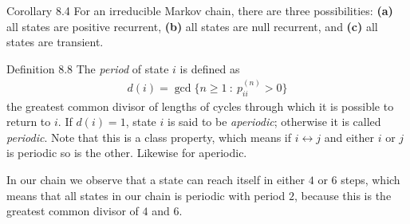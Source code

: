 \begin{boks}{Corollary 8.4}
  For an irreducible Markov chain, there are three possibilities: \textbf{(a)} all states are positive recurrent, \textbf{(b)} all states are null recurrent, and \textbf{(c)} all states are transient.
\end{boks}

\begin{boks}{Definition 8.8}
  The \textit{period} of state $i$ is defined as
  \begin{align*}
    d(i) = \gcd \{ n \geq 1 \ : \ p_{ii}^{(n)} > 0 \}
  \end{align*}
  the greatest common divisor of lengths of cycles through which it is possible to return to $i$. If $d(i) = 1$, state $i$ is said to be \textit{aperiodic}; otherwise it is called \textit{periodic}. Note that this is a class property, which means if $i \leftrightarrow j$ and either $i$ or $j$ is periodic so is the other. Likewise for aperiodic.
\end{boks}

In our chain we observe that a state can reach itself in either $4$ or $6$ steps, which means that all states in our chain is periodic with period $2$, because this is the greatest common divisor of $4$ and $6$.
